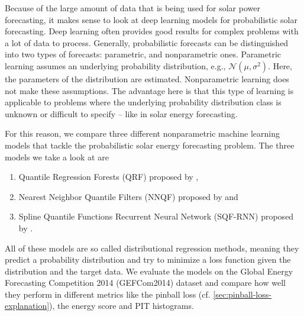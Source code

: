 Because of the large amount of data that is being used for solar power forecasting, it makes sense to look at 
deep learning models for probabilistic solar forecasting. 
Deep learning often provides good results for complex problems with a lot of data to process. 
Generally, probabilistic forecasts can be distinguished into two types of forecasts: parametric, and nonparametric ones. 
Parametric learning assumes an underlying probability distribution, e.g., \(\mathcal{N}(\mu, \sigma^2)\). Here, the parameters 
of the distribution are estimated. 
Nonparametric learning does not make these assumptions. 
The advantage here is that this type of learning is applicable to problems where the underlying 
probability distribution class is unknown or difficult to specify -- like in solar energy forecasting. 


For this reason, we compare three different nonparametric machine learning models 
that tackle the probabilistic solar energy forecasting problem. 
The three models we take a look at are 
\begin{enumerate}
    \item Quantile Regression Forests (QRF) proposed by \Textcite{Meinshausen2006},
    \item Nearest Neighbor Quantile Filters (NNQF) proposed by \Textcite{Ordiano2019} and
    \item Spline Quantile Functions Recurrent Neural Network (SQF-RNN) proposed by \Textcite{Gasthaus2019}.
\end{enumerate}
All of these models are so called distributional regression methods, meaning 
they predict a probability distribution and try to minimize a loss function 
given the distribution and the target data.
We evaluate the models on the Global Energy Forecasting Competition 2014 (GEFCom2014) dataset and compare how well they perform 
in different metrics like the pinball loss (cf. \ref{sec:pinball-loss-explanation}), the energy score and PIT histograms. 